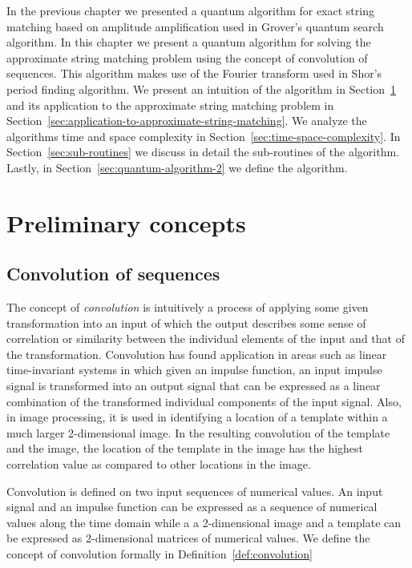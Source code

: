 \label{chapter:quantum-convolution}\label{chap:quantum-convolution}
In the previous chapter we presented a quantum algorithm for exact string matching based on amplitude amplification used in Grover's quantum search algorithm. In this chapter we present a quantum algorithm for solving the approximate string matching problem using the concept of convolution of sequences. This algorithm makes use of the Fourier transform used in Shor's period finding algorithm. We present an intuition of the algorithm in Section~\ref{sec:qcon-prelims} and its application to the approximate string matching problem in Section~\ref{sec:application-to-approximate-string-matching}. We analyze the algorithms time and space complexity in Section~\ref{sec:time-space-complexity}. In Section~\ref{sec:sub-routines} we discuss in detail the sub-routines of the algorithm. Lastly, in Section~\ref{sec:quantum-algorithm-2} we define the algorithm.

\section{Preliminary concepts}\label{sec:qcon-prelims}
\subsection{Convolution of sequences}
The concept of \textit{convolution} is intuitively a process of applying some given transformation into an input of which the output describes some sense of correlation or similarity between the individual elements of the input and that of the transformation. Convolution has found application in areas such as linear time-invariant systems in which given an impulse function, an input impulse signal is transformed into an output signal that can be expressed as a linear combination of the transformed individual components of the input signal. Also, in image processing, it is used in identifying a location of a template within a much larger 2-dimensional image. In the resulting convolution of the template and the image, the location of the template in the image has the highest correlation value as compared to other locations in the image.

Convolution is defined on two input sequences of numerical values. An input signal and an impulse function can be expressed as a sequence of numerical values along the time domain while a a 2-dimensional image and a template can be expressed as 2-dimensional matrices of numerical values. We define the concept of convolution formally in Definition~\ref{def:convolution}

